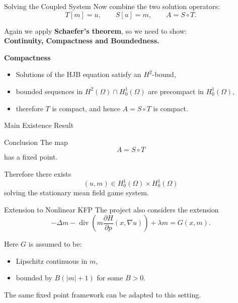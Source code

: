 \documentclass[aspectratio=169]{beamer}
\begin{document}
\begin{frame}{Solving the Coupled System}
Now combine the two solution operators:
\[
T[m]=u,\qquad S[u]=m,\qquad A=S\circ T.
\]

Again we apply \textbf{Schaefer's theorem}, so we need to show:\\
\textbf{Continuity, Compactness and Boundedness.}

\vspace{0.4cm}

\textbf{Compactness}
\begin{itemize}
    \item Solutions of the HJB equation satisfy an \(H^2\)-bound,
    \item bounded sequences in \(H^2(\Omega)\cap H_0^1(\Omega)\) are precompact in \(H_0^1(\Omega)\),
    \item  therefore \(T\) is compact, and hence \(A=S\circ T\) is compact.
\end{itemize}
\end{frame}
\begin{frame}{Main Existence Result}
\begin{block}{Conclusion}
The map
\[
A=S\circ T
\]
has a fixed point.
\end{block}

Therefore there exists
\[
(u,m)\in H_0^1(\Omega)\times H_0^1(\Omega)
\]
solving the stationary mean field game system.
\end{frame}

\begin{frame}{Extension to Nonlinear KFP}
The project also considers the extension
\[
-\Delta m - \operatorname{div}\!\left(m \frac{\partial H}{\partial p}(x,\nabla u)\right) + \lambda m = G(x,m).
\]

\vspace{0.4cm}

Here \(G\) is assumed to be:
\begin{itemize}
    \item Lipschitz continuous in \(m\),
    \item bounded by \(B(|m| + 1)\) for some \(B >0\).
\end{itemize}

\vspace{0.4cm}

The same fixed point framework can be adapted to this setting.
\end{frame}
\end{document}
